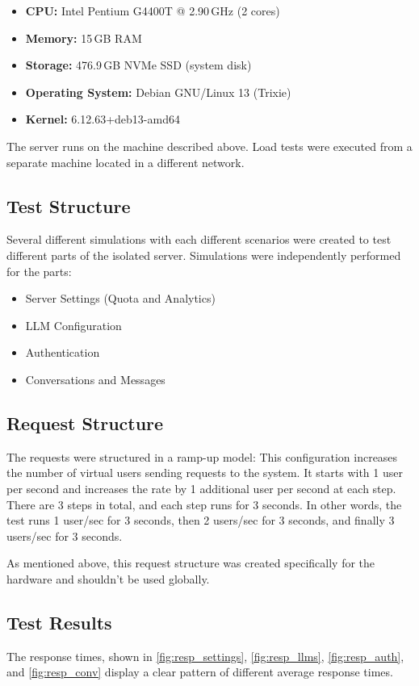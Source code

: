 \begin{itemize}
\item \textbf{CPU:} Intel Pentium G4400T @ 2.90\,GHz (2 cores)
\item \textbf{Memory:} 15\,GB RAM
\item \textbf{Storage:} 476.9\,GB NVMe SSD (system disk)
\item \textbf{Operating System:} Debian GNU/Linux 13 (Trixie)
\item \textbf{Kernel:} 6.12.63+deb13-amd64
\end{itemize}

The server runs on the machine described above. Load tests were executed from a separate machine located in a different network.

\subsection{Test Structure}
Several different simulations with each different scenarios were created to test different parts of the isolated server.
Simulations were independently performed for the parts:

\begin{itemize}
    \item Server Settings (Quota and Analytics)
    \item LLM Configuration
    \item Authentication
    \item Conversations and Messages
\end{itemize}

\subsection{Request Structure}
The requests were structured in a ramp-up model: 
This configuration increases the number of virtual users sending requests to the system. It starts with 1 user per second and increases the rate by 1 additional user per second at each step. There are 3 steps in total, and each step runs for 3 seconds. In other words, the test runs 1 user/sec for 3 seconds, then 2 users/sec for 3 seconds, and finally 3 users/sec for 3 seconds.

As mentioned above, this request structure was created specifically for the hardware and shouldn't be used globally.

\subsection{Test Results}
The response times, shown in \ref{fig:resp_settings}, \ref{fig:resp_llms}, \ref{fig:resp_auth}, and \ref{fig:resp_conv} display a clear pattern of different average response times.

